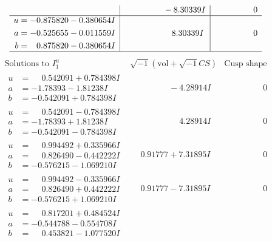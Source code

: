 \documentclass[1p]{elsarticle_modified}
\theoremstyle{definition}
\newcommand{\I}{\sqrt{-1}}
\begin{document}
$$\begin{array}{c|c|c}
 & \phantom{-0.000000 } -8.30339 I & \phantom{-0.000000 } 0 \\ \hline\begin{aligned}
u &= -0.875820 - 0.380654 I \\
a &= -0.525655 - 0.011559 I \\
b &= \phantom{-}0.875820 - 0.380654 I\end{aligned}
 & \phantom{-0.000000 -}8.30339 I & \phantom{-0.000000 } 0\\
 \hline 
 \end{array}$$\newpage$$\begin{array}{c|c|c}  
\text{Solutions to }I^u_{1}& \I (\text{vol} + \sqrt{-1}CS) & \text{Cusp shape}\\
 \hline 
\begin{aligned}
u &= \phantom{-}0.542091 + 0.784398 I \\
a &= -1.78393 - 1.81238 I \\
b &= -0.542091 + 0.784398 I\end{aligned}
 & \phantom{-0.000000 } -4.28914 I & \phantom{-0.000000 } 0 \\ \hline\begin{aligned}
u &= \phantom{-}0.542091 - 0.784398 I \\
a &= -1.78393 + 1.81238 I \\
b &= -0.542091 - 0.784398 I\end{aligned}
 & \phantom{-0.000000 -}4.28914 I & \phantom{-0.000000 } 0 \\ \hline\begin{aligned}
u &= \phantom{-}0.994492 + 0.335966 I \\
a &= \phantom{-}0.826490 - 0.442222 I \\
b &= -0.576215 - 1.069210 I\end{aligned}
 & \phantom{-}0.91777 + 7.31895 I & \phantom{-0.000000 } 0 \\ \hline\begin{aligned}
u &= \phantom{-}0.994492 - 0.335966 I \\
a &= \phantom{-}0.826490 + 0.442222 I \\
b &= -0.576215 + 1.069210 I\end{aligned}
 & \phantom{-}0.91777 - 7.31895 I & \phantom{-0.000000 } 0 \\ \hline\begin{aligned}
u &= \phantom{-}0.817201 + 0.484524 I \\
a &= -0.544788 - 0.554708 I \\
b &= \phantom{-}0.453821 - 1.077520 I\end{aligned}

\end{array}$$
\end{document}

